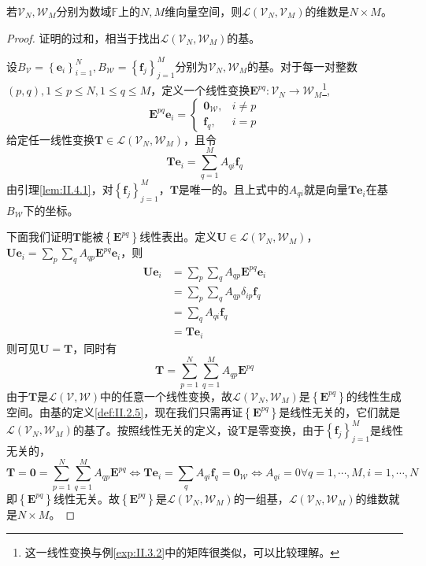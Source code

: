 \documentclass[main.tex]{subfiles}
\begin{document}
\begin{theorem}\label{thm:II.4.2}
若$\mathcal{V}_N,\mathcal{W}_M$分别为数域$\mathbb{F}$上的$N,M$维向量空间，则$\mathcal{L}\left(\mathcal{V}_N,\mathcal{V}_M\right)$的维数是$N\times M$。
\end{theorem}
\begin{proof}
证明的过和，相当于找出$\mathcal{L}\left(\mathcal{V}_N,\mathcal{W}_M\right)$的基。

设$B_\mathcal{V}=\left\{\mathbf{e}_i\right\}_{i=1}^N,B_\mathcal{W}=\left\{\mathbf{f}_j\right\}_{j=1}^M$分别为$\mathcal{V}_N,\mathcal{W}_M$的基。对于每一对整数$\left(p,q\right),1\leq p\leq N,1\leq q\leq M$，定义一个线性变换$\mathbf{E}^{pq}:\mathcal{V}_N\rightarrow\mathcal{W}_M$\footnote{这一线性变换与例\ref{exp:II.3.2}中的矩阵很类似，可以比较理解。},
\[
\mathbf{E}^{pq}\mathbf{e}_i=\left\{\begin{array}{cc}
    \mathbf{0}_\mathcal{W},&i\neq p  \\
     \mathbf{f}_q,&i=p 
\end{array}\right.
\]
给定任一线性变换$\mathbf{T}\in\mathcal{L}\left(\mathcal{V}_N,\mathcal{W}_M\right)$，且令
\[\mathbf{Te}_i=\sum_{q=1}^MA_{qi}\mathbf{f}_q\]
由引理\ref{lem:II.4.1}，对$\left\{\mathbf{f}_j\right\}_{j=1}^M$，$\mathbf{T}$是唯一的。且上式中的$A_{qi}$就是向量$\mathbf{Te}_i$在基$B_\mathcal{W}$下的坐标。

下面我们证明$\mathbf{T}$能被$\left\{\mathbf{E}^{pq}\right\}$线性表出。定义$\mathbf{U}\in\mathcal{L}\left(\mathcal{V}_N,\mathcal{W}_M\right)$，$\mathbf{Ue}_i=\sum_p\sum_qA_{qp}\mathbf{E}^{pq}\mathbf{e}_i$，则
\begin{align*}
    \mathbf{Ue}_i&=\sum_p\sum_qA_{qp}\mathbf{E}^{pq}\mathbf{e}_i\\
    &=\sum_p\sum_qA_{qp}\delta_{ip}\mathbf{f}_q\\
    &=\sum_qA_{qi}\mathbf{f}_q\\
    &=\mathbf{Te}_i
\end{align*}
则可见$\mathbf{U}=\mathbf{T}$，同时有
\[\mathbf{T}=\sum_{p=1}^N\sum_{q=1}^MA_{qp}\mathbf{E}^{pq}\]
由于$\mathbf{T}$是$\mathcal{L}\left(\mathcal{V},\mathcal{W}\right)$中的任意一个线性变换，故$\mathcal{L}\left(\mathcal{V}_N,\mathcal{W}_M\right)$是$\left\{\mathbf{E}^{pq}\right\}$的线性生成空间。由基的定义\ref{def:II.2.5}，现在我们只需再证$\left\{\mathbf{E}^{pq}\right\}$是线性无关的，它们就是$\mathcal{L}\left(\mathcal{V}_N,\mathcal{W}_M\right)$的基了。按照线性无关的定义，设$\mathbf{T}$是零变换，由于$\left\{\mathbf{f}_j\right\}_{j=1}^M$是线性无关的，
\[\mathbf{T}=\mathbf{0}=\sum_{p=1}^N\sum_{q=1}^MA_{qp}\mathbf{E}^{pq}\Leftrightarrow\mathbf{Te}_i=\sum_q A_{qi}\mathbf{f}_q=\mathbf{0}_\mathcal{W}\Leftrightarrow A_{qi}=0\forall q=1,\cdots,M,i=1,\cdots,N\]
即$\left\{\mathbf{E}^{pq}\right\}$线性无关。故$\left\{\mathbf{E}^{pq}\right\}$是$\mathcal{L}\left(\mathcal{V}_N,\mathcal{W}_M\right)$的一组基，$\mathcal{L}\left(\mathcal{V}_N,\mathcal{W}_M\right)$的维数就是$N\times M$。
\end{proof}
\end{document}
